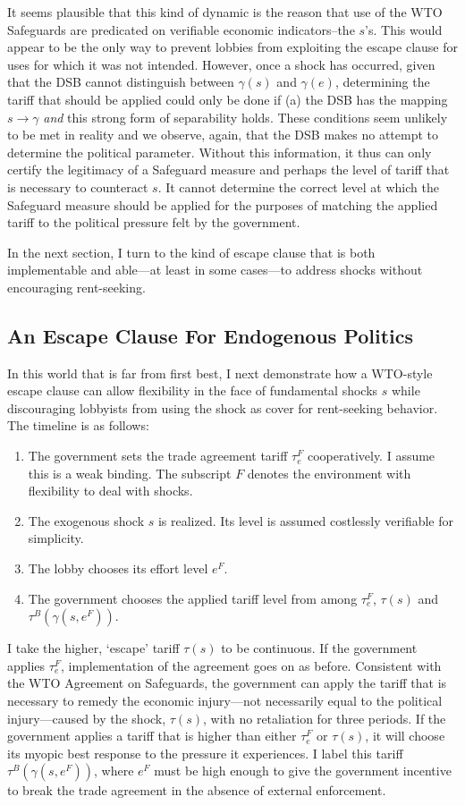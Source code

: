 \documentclass[12pt]{article}
\newcommand{\ga}{\gamma}
\begin{document}
It seems plausible that this kind of dynamic is the reason that use of the WTO Safeguards are predicated on verifiable economic indicators--the $s$'s. This would appear to be the only way to prevent lobbies from exploiting the escape clause for uses for which it was not intended. However, once a shock has occurred, given that the DSB cannot distinguish between $\ga(s)$ and $\ga(e)$, determining the tariff that should be applied could only be done if (a) the DSB has the mapping $s \rightarrow \ga$ \textit{and} this strong form of separability holds. These conditions seem unlikely to be met in reality and we observe, again, that the DSB makes no attempt to determine the political parameter. Without this information, it thus can only certify the legitimacy of a Safeguard measure and perhaps the level of tariff that is necessary to counteract $s$. It cannot determine the correct level at which the Safeguard measure should be applied for the purposes of matching the applied tariff to the political pressure felt by the government.

In the next section, I turn to the kind of escape clause that is both implementable and able---at least in some cases---to address shocks without encouraging rent-seeking.

\subsection{An Escape Clause For Endogenous Politics}
\label{sec:ECendog}
In this world that is far from first best, I next demonstrate how a WTO-style escape clause can allow flexibility in the face of fundamental shocks $s$ while discouraging lobbyists from using the shock as cover for rent-seeking behavior. The timeline is as follows:
\begin{enumerate}
	\item The government sets the trade agreement tariff $\tau_e^F$ cooperatively. I assume this is a weak binding. The subscript $F$ denotes the environment with flexibility to deal with shocks.
	\item The exogenous shock $s$ is realized. Its level is assumed costlessly verifiable for simplicity.
	\item The lobby chooses its effort level $e^F$.
	\item The government chooses the applied tariff level from among $\tau_e^F$, $\tau(s)$ and $\tau^B(\ga(s,e^F))$.
\end{enumerate}
I take the higher, `escape' tariff $\tau(s)$ to be continuous. If the government applies $\tau_e^F$, implementation of the agreement goes on as before. Consistent with the WTO Agreement on Safeguards, the government can apply the tariff that is necessary to remedy the economic injury---not necessarily equal to the political injury---caused by the shock, $\tau(s)$, with no retaliation for three periods. If the government applies a tariff that is higher than either $\tau_e^F$ or $\tau(s)$, it will choose its myopic best response to the pressure it experiences. I label this tariff $\tau^B(\ga(s,e^F))$, where $e^F$ must be high enough to give the government incentive to break the trade agreement in the absence of external enforcement.
\end{document}
